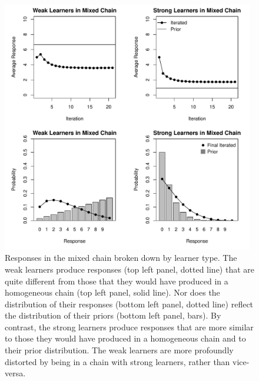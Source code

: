 \documentclass[doc]{apa6}
\begin{document}
\begin{figure}[t]
\begin{center}
\includegraphics[width=11cm]{coinsfail2.pdf} 
\caption{\small{Responses in the mixed chain broken down by learner type. The {\sc weak} learners produce responses (top left panel, dotted line) that are quite different from those that they would have produced in a homogeneous chain (top left panel, solid line). Nor does the distribution of their responses (bottom left panel, dotted line)  reflect the distribution of their priors (bottom left panel, bars). By contrast, the {\sc strong} learners produce responses that are more similar to those they would have produced in a homogeneous chain and to their prior distribution. The {\sc weak} learners are more profoundly distorted by being in a chain with {\sc strong} learners, rather than vice-versa.}}
\label{coinsfail2}
\end{center}
\end{figure}
\end{document}
